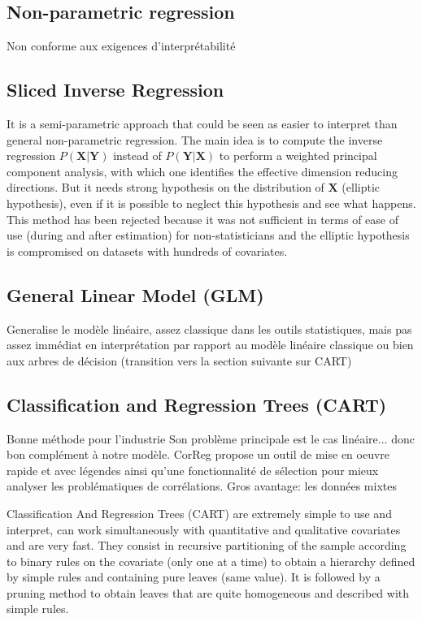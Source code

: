 \documentclass[12pt,a4paper]{report}
\begin{document}
	\subsection{Non-parametric regression}
	\cite{eubank1999nonparametric,hardle1990applied}
		Non conforme aux exigences d'interprétabilité
	\subsection{Sliced Inverse Regression}
		It is a semi-parametric approach that could be seen as easier to interpret than general non-parametric regression. 
		The main idea is to compute the inverse regression $P(\boldsymbol{X}|\boldsymbol{Y})$ instead of $P(\boldsymbol{Y}|\boldsymbol{X})$ to perform a weighted principal component analysis, with which one identifies the effective dimension reducing directions\cite{li1991sliced}. But it needs strong hypothesis on the distribution of $\boldsymbol{X}$ (elliptic hypothesis), even if it is possible to neglect this hypothesis \cite{saracco1999regression} and see what happens. This method has been rejected because it was not sufficient in terms of ease of use (during and after estimation) for non-statisticians and the elliptic hypothesis is compromised on datasets with hundreds of covariates.
			
		
	\subsection{General Linear Model (GLM)}
		\cite{kiebel2003general,wickens2004general,nelder1972generalized,mccullagh1989generalized}
		Generalise le modèle linéaire, assez classique dans les outils statistiques, mais pas assez immédiat en interprétation par rapport au modèle linéaire classique ou bien aux arbres de décision (transition vers la section suivante sur CART)
\subsection{Classification and Regression Trees (CART)}
		\cite{breiman1984classification}%
		Bonne méthode pour l'industrie
		Son problème principale est le cas linéaire... donc bon complément à notre modèle.
		CorReg propose un outil de mise en oeuvre rapide et avec légendes ainsi qu'une fonctionnalité de sélection pour mieux analyser les problématiques de corrélations.	
		Gros avantage: les données mixtes	
	
		Classification And Regression Trees (CART) are extremely simple to use and interpret, can work simultaneously with quantitative and qualitative covariates and are very fast. They consist in recursive partitioning of the sample according to binary rules on the covariate (only one at a time) to obtain a hierarchy defined by simple rules and containing pure leaves (same value). It is followed by a pruning method to obtain leaves that are quite homogeneous and described with simple rules.
		
\end{document}
